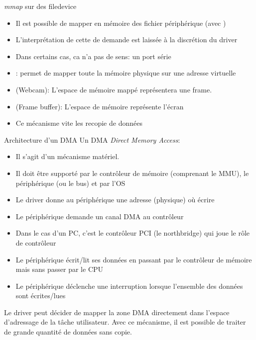 \begin{frame}[fragile=singleslide]{\emph{mmap} sur des filedevice}
  \begin{itemize}
  \item Il est possible de  mapper en mémoire des fichier périphérique
    (avec )
  \item  L'interprétation  de  cette  de  demande  est  laissée  à  la
    discrétion du driver
  \item Dans certains cas, ca n'a pas de sens: un port série
  \item {}:  permet de mapper toute la  mémoire physique sur
    une adresse virtuelle
  \item   {}   (Webcam):   L'espace  de   mémoire   mappé
    représentera une frame.
  \item  {} (Frame buffer):  L'espace de  mémoire représente
    l'écran
  \item Ce mécanisme vite les recopie de données
  \end{itemize}
\end{frame}

\begin{frame}[fragile=singleslide]{Architecture d'un DMA}
  Un DMA \emph{Direct Memory Access}:
  \begin{itemize}
  \item Il s'agit d'un mécanisme matériel.
  \item  Il   doit  être  supporté   par  le  contrôleur   de  mémoire
    (comprenant le MMU), le périphérique (ou le bus) et par l'OS
  \item Le  driver donne au périphérique  une adresse  (physique) où
    écrire
  \item Le périphérique demande un canal DMA au contrôleur
  \item Dans le cas d'un PC, c'est le contrôleur PCI (le northbridge)
    qui joue le rôle de contrôleur
  \item  Le  périphérique écrit/lit  ses  données  en  passant par  le
    contrôleur de mémoire mais sans passer par le CPU
  \item Le périphérique  déclenche une interruption lorsque l'ensemble
    des données sont écrites/lues
  \end{itemize}
  Le  driver peut  décider  de  mapper la  zone  DMA directement  dans
  l'espace d'adressage de la  tâche utilisateur. Avec ce mécanisme, il
  est possible de traiter de grande quantité de données sans copie.
\end{frame}


